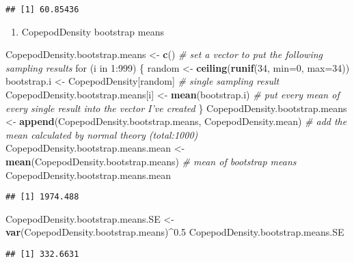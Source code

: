 \documentclass[]{article}
\newenvironment{Shaded}{\begin{snugshade}}{\end{snugshade}}
\newcommand{\KeywordTok}[1]{\textcolor[rgb]{0.13,0.29,0.53}{\textbf{{#1}}}}
\newcommand{\DataTypeTok}[1]{\textcolor[rgb]{0.13,0.29,0.53}{{#1}}}
\newcommand{\DecValTok}[1]{\textcolor[rgb]{0.00,0.00,0.81}{{#1}}}
\newcommand{\FloatTok}[1]{\textcolor[rgb]{0.00,0.00,0.81}{{#1}}}
\newcommand{\StringTok}[1]{\textcolor[rgb]{0.31,0.60,0.02}{{#1}}}
\newcommand{\CommentTok}[1]{\textcolor[rgb]{0.56,0.35,0.01}{\textit{{#1}}}}
\newcommand{\NormalTok}[1]{{#1}}
\providecommand{\tightlist}{%
  \setlength{\itemsep}{0pt}\setlength{\parskip}{0pt}}
\begin{document}
\begin{verbatim}
## [1] 60.85436
\end{verbatim}

\begin{enumerate}
\def\labelenumi{(\arabic{enumi})}
\setcounter{enumi}{1}
\tightlist
\item
  CopepodDensity bootstrap means
\end{enumerate}

\begin{Shaded}
\begin{Highlighting}[]
\NormalTok{CopepodDensity.bootstrap.means <-}\StringTok{ }\KeywordTok{c}\NormalTok{() }\CommentTok{# set a vector to put the following sampling results}
\NormalTok{for (i in }\DecValTok{1}\NormalTok{:}\DecValTok{999}\NormalTok{) \{}
\NormalTok{random <-}\StringTok{ }\KeywordTok{ceiling}\NormalTok{(}\KeywordTok{runif}\NormalTok{(}\DecValTok{34}\NormalTok{, }\DataTypeTok{min=}\DecValTok{0}\NormalTok{, }\DataTypeTok{max=}\DecValTok{34}\NormalTok{))}
\NormalTok{bootstrap.i <-}\StringTok{ }\NormalTok{CopepodDensity[random] }\CommentTok{# single sampling result}
\NormalTok{CopepodDensity.bootstrap.means[i] <-}\StringTok{ }\KeywordTok{mean}\NormalTok{(bootstrap.i) }\CommentTok{# put every mean of every single result into the vector I've created}
\NormalTok{\}}
\NormalTok{CopepodDensity.bootstrap.means <-}\StringTok{ }\KeywordTok{append}\NormalTok{(CopepodDensity.bootstrap.means, CopepodDensity.mean) }\CommentTok{# add the mean calculated by normal theory (total:1000)}
\NormalTok{CopepodDensity.bootstrap.means.mean <-}\StringTok{ }\KeywordTok{mean}\NormalTok{(CopepodDensity.bootstrap.means) }\CommentTok{# mean of bootstrap means}
\NormalTok{CopepodDensity.bootstrap.means.mean}
\end{Highlighting}
\end{Shaded}

\begin{verbatim}
## [1] 1974.488
\end{verbatim}

\begin{Shaded}
\begin{Highlighting}[]
\NormalTok{CopepodDensity.bootstrap.means.SE <-}\StringTok{ }\KeywordTok{var}\NormalTok{(CopepodDensity.bootstrap.means)^}\FloatTok{0.5}
\NormalTok{CopepodDensity.bootstrap.means.SE}
\end{Highlighting}
\end{Shaded}

\begin{verbatim}
## [1] 332.6631
\end{verbatim}
\end{document}
